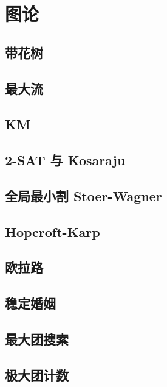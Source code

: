 \documentclass[10pt]{article}
\begin{document}
\section{图论}
	\subsection{带花树}
		

	\subsection{最大流}
		
	
	\subsection{KM}
		

	\subsection{2-SAT 与 Kosaraju}
		

	\subsection{全局最小割 Stoer-Wagner}
		

	\subsection{Hopcroft-Karp}
		

	\subsection{欧拉路}
		

	\subsection{稳定婚姻}
		

	\subsection{最大团搜索}
		
	
	\subsection{极大团计数}
		
\end{document}

